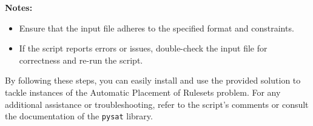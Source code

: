 \textbf{Notes:}
\begin{itemize}
    \item Ensure that the input file adheres to the specified format and constraints.
    \item If the script reports errors or issues, double-check the input file for correctness and re-run the script.
\end{itemize}

By following these steps, you can easily install and use the provided solution to tackle instances of the Automatic Placement of Rulesets problem. For any additional assistance or troubleshooting, refer to the script's comments or consult the documentation of the \texttt{pysat} library.
